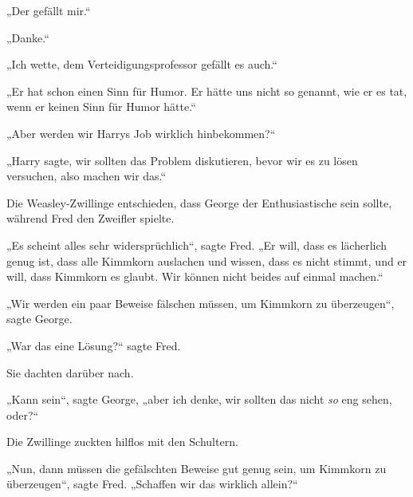 „Der gefällt mir.“

„Danke.“

„Ich wette, dem Verteidigungsprofessor gefällt es auch.“

„Er hat schon einen Sinn für Humor. Er hätte uns nicht so genannt, wie er es tat, wenn er keinen Sinn für Humor hätte.“

„Aber werden wir Harrys Job wirklich hinbekommen?“

„Harry sagte, wir sollten das Problem diskutieren, bevor wir es zu lösen versuchen, also machen wir das.“

Die Weasley-Zwillinge entschieden, dass George der Enthusiastische sein sollte, während Fred den Zweifler spielte.

„Es scheint alles sehr widersprüchlich“, sagte Fred.
„Er will, dass es lächerlich genug ist, dass alle Kimmkorn auslachen und wissen, dass es nicht stimmt, und er will, dass Kimmkorn es glaubt. Wir können nicht beides auf einmal machen.“

„Wir werden ein paar Beweise fälschen müssen, um Kimmkorn zu überzeugen“, sagte George.

„War das eine Lösung?“ sagte Fred.

Sie dachten darüber nach.

„Kann sein“, sagte George, „aber ich denke, wir sollten das nicht \emph{so} eng sehen, oder?“

Die Zwillinge zuckten hilflos mit den Schultern.

„Nun, dann müssen die gefälschten Beweise gut genug sein, um Kimmkorn zu überzeugen“, sagte Fred.
„Schaffen wir das wirklich allein?“

